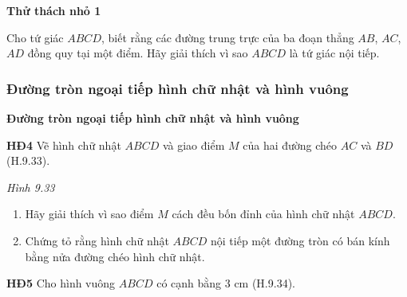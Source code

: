 \begin{lesson}
    \answerline
    \answerline
    \answerline

    \textbf{Thử thách nhỏ 1}

    Cho tứ giác $ABCD$, biết rằng các đường trung trực của ba đoạn thẳng $AB$, $AC$, $AD$ đồng quy tại một điểm. Hãy giải thích vì sao $ABCD$ là tứ giác nội tiếp.

    \answerline
    \answerline

    \subsubsection{Đường tròn ngoại tiếp hình chữ nhật và hình vuông}

    \textbf{Đường tròn ngoại tiếp hình chữ nhật và hình vuông}

    \textbf{HĐ4} Vẽ hình chữ nhật $ABCD$ và giao điểm $M$ của hai đường chéo $AC$ và $BD$ (H.9.33).

    \begin{center}

        \textit{Hình 9.33}
    \end{center}

    \begin{enumerate}[label=\alph*)]
        \item Hãy giải thích vì sao điểm $M$ cách đều bốn đỉnh của hình chữ nhật $ABCD$.
        \item Chứng tỏ rằng hình chữ nhật $ABCD$ nội tiếp một đường tròn có bán kính bằng nửa đường chéo hình chữ nhật.
    \end{enumerate}

    \answerline
    \answerline

    \textbf{HĐ5} Cho hình vuông $ABCD$ có cạnh bằng 3 cm (H.9.34).

    \begin{center}


\end{center}
\end{lesson}
